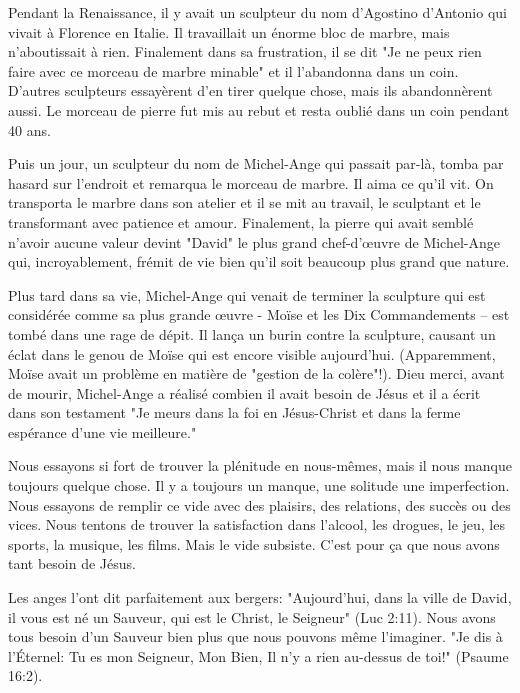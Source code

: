 

Pendant la Renaissance, il y avait un sculpteur du nom d'Agostino d'Antonio qui vivait à Florence en Italie. Il travaillait un énorme bloc de marbre, mais n'aboutissait à rien. Finalement dans sa frustration, il se dit "Je ne peux rien faire avec ce morceau de marbre minable" et il l'abandonna dans un coin. D'autres sculpteurs essayèrent d'en tirer quelque chose, mais ils abandonnèrent aussi. Le morceau de pierre fut mis au rebut et resta oublié dans un coin pendant 40 ans.

Puis un jour, un sculpteur du nom de Michel-Ange qui passait par-là, tomba par hasard sur l'endroit et remarqua le morceau de marbre. Il aima ce qu'il vit. On transporta le marbre dans son atelier et il se mit au travail, le sculptant et le transformant avec patience et amour. Finalement, la pierre qui avait semblé n'avoir aucune valeur devint       "David" le plus grand chef-d'œuvre de Michel-Ange qui, incroyablement, frémit de vie bien qu'il soit beaucoup plus grand que nature.

Plus tard dans sa vie, Michel-Ange qui venait de terminer la sculpture qui est considérée comme sa plus grande œuvre - Moïse et les Dix Commandements – est tombé dans une rage de dépit. Il lança un burin contre la sculpture, causant un éclat dans le genou de Moïse qui est encore visible aujourd'hui. (Apparemment, Moïse avait un problème en matière de "gestion de la colère"!). Dieu merci, avant de mourir, Michel-Ange a réalisé combien il avait besoin de Jésus et il a écrit dans son testament "Je meurs dans la foi en Jésus-Christ et dans la ferme espérance d'une vie meilleure."

Nous essayons si fort de trouver la plénitude en nous-mêmes, mais il nous manque toujours quelque chose. Il y a toujours un manque, une solitude une imperfection. Nous essayons de remplir ce vide avec des plaisirs, des relations, des succès ou des vices. Nous tentons de trouver la satisfaction dans l'alcool, les drogues, le jeu, les sports, la musique, les films. Mais le vide subsiste. C'est pour ça que nous avons tant besoin de Jésus.

Les anges l'ont dit parfaitement aux bergers:  "Aujourd'hui, dans la ville de David, il vous est né un Sauveur, qui est le Christ, le Seigneur" (Luc 2:11). Nous avons tous besoin d'un Sauveur bien plus que nous pouvons même l'imaginer. "Je dis à l'Éternel: Tu es mon Seigneur, Mon Bien, Il n'y a rien au-dessus de toi!" (Psaume 16:2).

